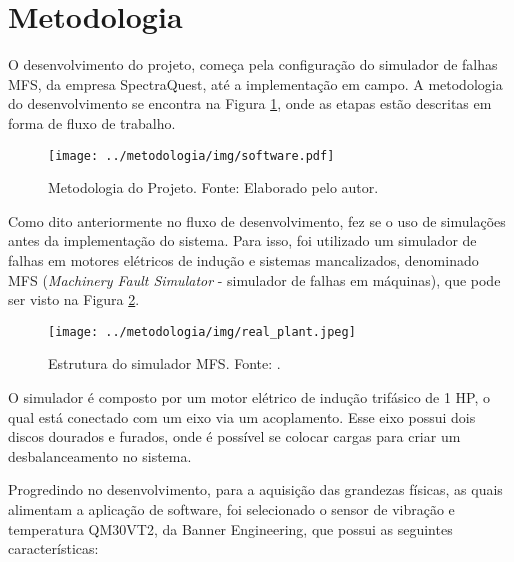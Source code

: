\documentclass[a4paper]{ifacconf}
\begin{document}

\section{Metodologia}

O desenvolvimento do projeto, começa pela configuração do simulador de falhas MFS\textsuperscript\textregistered,
da empresa SpectraQuest\textsuperscript\textregistered, até a implementação em campo. A metodologia do desenvolvimento se encontra na
Figura \ref{fig:metodologia}, onde as etapas estão descritas em forma de fluxo de trabalho.

\begin{figure}[H]
  \begin{center}
      \texttt{[image: ../metodologia/img/software.pdf]}
      \caption{Metodologia do Projeto. Fonte: Elaborado pelo autor.}
  \end{center} 
  \label{fig:metodologia}
\end{figure}

Como dito anteriormente no fluxo de desenvolvimento, fez se o uso de simulações antes da implementação do sistema.
Para isso, foi utilizado um simulador de falhas em motores elétricos de indução e sistemas mancalizados, denominado
MFS \textsuperscript \textregistered (\textit{Machinery Fault Simulator} - simulador de falhas em máquinas), que pode ser visto na Figura 
\ref{fig:real_plant}.

\begin{figure}[H]
    \begin{center}
        \texttt{[image: ../metodologia/img/real\_plant.jpeg]}
    \end{center}
    \caption{Estrutura do simulador MFS\textsuperscript\textregistered. Fonte: \cite{SpectraQuest2011}.}
    \label{fig:real_plant}
\end{figure}

O simulador é composto por um motor elétrico de indução trifásico de 1 HP, o qual está conectado com um eixo via um 
acoplamento. Esse eixo possui dois discos dourados e furados, onde é possível se colocar cargas para criar um desbalanceamento no sistema.

Progredindo no desenvolvimento, para a aquisição das grandezas físicas, as quais alimentam a aplicação de software, foi selecionado o sensor 
de vibração e temperatura QM30VT2\textsuperscript\textregistered, da Banner Engineering\textsuperscript\textregistered, que possui as seguintes características:
\end{document}
